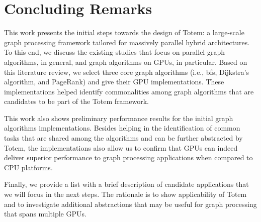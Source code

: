 \section{Concluding Remarks}
\label{sec:conclusion}
This work presents the initial steps towards the design of {\sc Totem}: a large-scale graph processing framework tailored for massively parallel hybrid architectures. To this end, we discuss the existing studies that focus on parallel graph algorithms, in general, and graph algorithms on GPUs, in particular. Based on this literature review, we select three core graph algorithms (i.e., {\sc bfs}, Dijkstra's algorithm, and PageRank) and give their GPU implementations. These implementations helped identify commonalities among graph algorithms that are candidates to be part of the {\sc Totem} framework. 

This work also shows preliminary performance results for the initial graph algorithms implementations. Besides helping in the identification of common tasks that are shared among the algorithms and can be further abstracted by {\sc Totem}, the implementations also allow us to confirm that GPUs can indeed deliver superior performance to graph processing applications when compared to CPU platforms.

Finally, we provide a list with a brief description of candidate applications that we will focus in the next steps. The rationale is to show applicability of {\sc Totem} and to investigate additional abstractions that may be useful for graph processing that spans multiple GPUs.